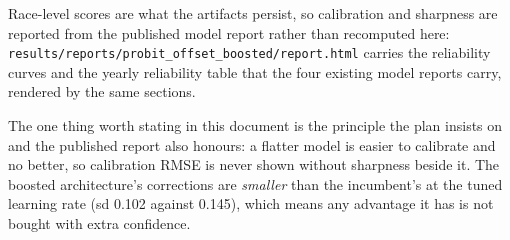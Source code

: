 Race-level scores are what the artifacts persist, so calibration and sharpness are reported from the published model report rather than recomputed here: \texttt{results/reports/probit\_offset\_boosted/report.html} carries the reliability curves and the yearly reliability table that the four existing model reports carry, rendered by the same sections.

The one thing worth stating in this document is the principle the plan insists on and the published report also honours: a flatter model is easier to calibrate and no better, so calibration RMSE is never shown without sharpness beside it. The boosted architecture's corrections are \emph{smaller} than the incumbent's at the tuned learning rate (sd 0.102 against 0.145), which means any advantage it has is not bought with extra confidence.
